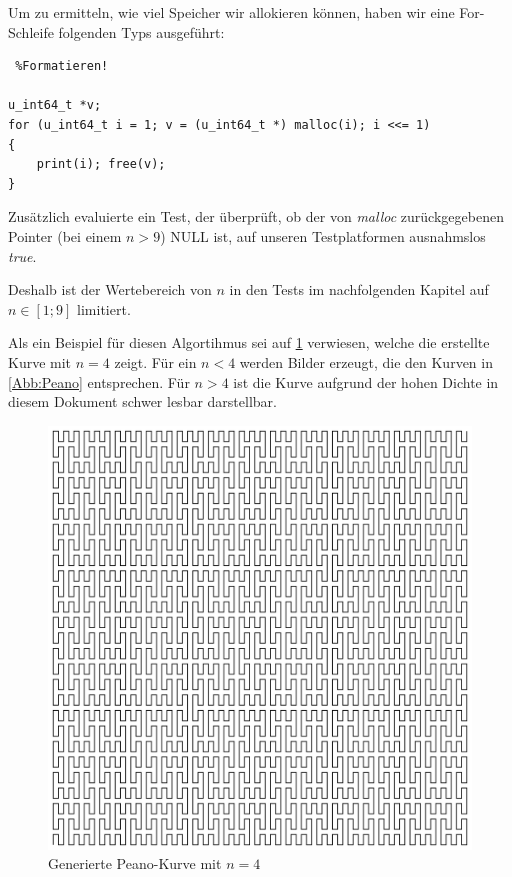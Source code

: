 \documentclass[course=asp]{aspdoc}
\begin{document}
Um zu ermitteln, wie viel Speicher wir allokieren k\"onnen, haben wir eine For-Schleife  folgenden Typs ausgef\"uhrt:

\begin{lstlisting} %Formatieren! 

u_int64_t *v;
for (u_int64_t i = 1; v = (u_int64_t *) malloc(i); i <<= 1)   
{     
    print(i); free(v);
}
\end{lstlisting}

Zus\"atzlich evaluierte ein Test, der \"uberpr\"uft, ob der von \textit{malloc} zur\"uckgegebenen Pointer (bei einem $n > 9$) NULL ist, auf unseren Testplatformen ausnahmslos \textit{true}. %

Deshalb ist der Wertebereich von $n$ in den Tests im nachfolgenden Kapitel auf $ n \in [1;9]$ limitiert.

Als ein Beispiel f\"ur diesen Algortihmus sei auf \ref{Abb:Generierte Kurve Grad 4} verwiesen, welche die erstellte Kurve mit $n = 4$ zeigt. F\"ur ein $n < 4$ werden Bilder erzeugt, die den Kurven in \ref{Abb:Peano} entsprechen. F\"ur $n > 4$ ist die Kurve aufgrund der hohen Dichte in diesem Dokument schwer lesbar darstellbar.

\begin{figure}[ht]
\centering
\includegraphics[scale = 0.2]{peanoGrad4.png}
\caption{Generierte Peano-Kurve mit $n = 4$}\label{Abb:Generierte Kurve Grad 4}
\end{figure}
\end{document}
